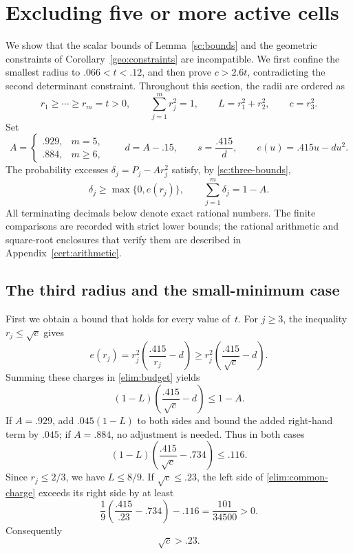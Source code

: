 \section{Excluding five or more active cells}\label{elim:section}

We show that the scalar bounds of Lemma~\ref{sc:bounds} and the
geometric constraints of Corollary~\ref{geo:constraints} are incompatible.
We first confine the smallest radius to $.066<t<.12$, and then prove
$c>2.6t$, contradicting the second determinant constraint.
Throughout this section, the radii are ordered as
\[
 r_1\ge\cdots\ge r_m=t>0,\qquad
 \sum_{j=1}^m r_j^2=1,\qquad
 L=r_1^2+r_2^2,\qquad c=r_3^2.
\]
Set
\begin{equation}\label{elim:parameters}
 A=\begin{cases}.929,&m=5,\\.884,&m\ge6,\end{cases}
 \qquad d=A-.15,\qquad s=\frac{.415}{d},
 \qquad e(u)=.415u-du^2.
\end{equation}
The probability excesses
\(\delta_j=P_j-Ar_j^2\) satisfy, by \eqref{sc:three-bounds},
\begin{equation}\label{elim:budget}
 \delta_j\ge\max\{0,e(r_j)\},\qquad
 \sum_{j=1}^m\delta_j=1-A.
\end{equation}
All terminating decimals below denote exact rational numbers. The finite
comparisons are recorded with strict lower bounds; the rational arithmetic
and square-root enclosures that verify them are described in
Appendix~\ref{cert:arithmetic}.

\subsection{The third radius and the small-minimum case}

First we obtain a bound that holds for every value of~$t$.
For $j\ge3$, the inequality $r_j\le\sqrt c$ gives
\[
 e(r_j)=r_j^2\left(\frac{.415}{r_j}-d\right)
 \ge r_j^2\left(\frac{.415}{\sqrt c}-d\right).
\]
Summing these charges in \eqref{elim:budget} yields
\[
 (1-L)\left(\frac{.415}{\sqrt c}-d\right)\le1-A.
\]
If $A=.929$, add $.045(1-L)$ to both sides and bound the added
right-hand term by $.045$; if $A=.884$, no adjustment is needed. Thus in both cases
\begin{equation}\label{elim:common-charge}
 (1-L)\left(\frac{.415}{\sqrt c}-.734\right)\le.116.
\end{equation}
Since $r_j\le2/3$, we have $L\le8/9$. If $\sqrt c\le.23$,
the left side of \eqref{elim:common-charge} exceeds its right side by
at least
\[
 \frac19\left(\frac{.415}{.23}-.734\right)-.116
 =\frac{101}{34500}>0.
\]
Consequently
\begin{equation}\label{elim:third-radius}
 \sqrt c>.23.
\end{equation}

